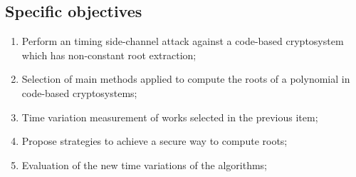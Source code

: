 \subsection{Specific objectives}
\begin{enumerate}[label=\roman*., itemsep=1pt]
    \item Perform an timing side-channel attack against a code-based cryptosystem which has non-constant root extraction;
    \item Selection of main methods applied to compute the roots of a polynomial in code-based cryptosystems;
    \item Time variation measurement of works selected in the previous item;
    \item Propose strategies to achieve a secure way to compute roots;
    \item Evaluation of the new time variations of the algorithms;
\end{enumerate}


